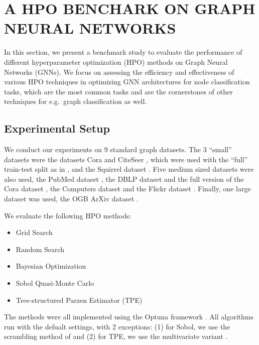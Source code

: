 \section{\uppercase{A HPO Benchark on Graph Neural Networks}}
\label{sec:benchmark}

In this section, we present a benchmark study to evaluate the performance of different hyperparameter optimization (HPO) methods on Graph Neural Networks (GNNs). We focus on assessing the efficiency and effectiveness of various HPO techniques in optimizing GNN architectures for node classification tasks, which are the most common tasks and are the cornerstones of other techniques for e.g.\ graph classification as well.

\subsection{Experimental Setup}
We conduct our experiments on 9 standard graph datasets. The 3 \enquote{small} datasets were the datasets Cora and CiteSeer \cite{yang_revisiting_2016}, which were used with the \enquote{full} train-test split as in \cite{chen_fastgcn_2018}, and the Squirrel dataset \cite{rozemberczki_multi-scale_2021}. Five medium sized datasets were also used, the PubMed dataset \cite{yang_revisiting_2016}, the DBLP dataset and the full version of the Cora dataset \cite{bojchevski_deep_2018}, the Computers dataset \cite{shchur_pitfalls_2019} and the Flickr dataset \cite{zeng_graphsaint_2019}. Finally, one large dataset was used, the OGB ArXiv dataset \cite{hu_open_2021}.

We evaluate the following HPO methods:
\begin{itemize}
	\item Grid Search
	\item Random Search
	\item Bayesian Optimization \cite{rasmussen_gaussian_2003}
	\item Sobol Quasi-Monte Carlo \cite{sobol_distribution_1967, bergstra_random_2012}
	\item Tree-structured Parzen Estimator (TPE) \cite{bergstra_algorithms_2011}
\end{itemize}
The methods were all implemented using the Optuna framework \cite{akiba_optuna_2019}. All algorithms run with the defualt settings, with 2 exceptions: (1) for Sobol, we use the scrambling method of \cite{matousek_l2-discrepancy_1998} and (2) for TPE, we use the multivariate variant \cite{falkner_bohb_2018}.

